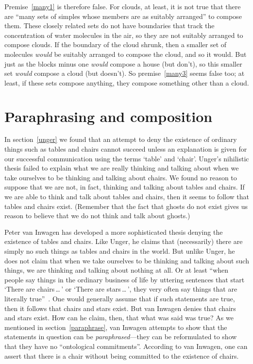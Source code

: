 \documentclass[11pt]{article}
\begin{document}
\begin{spacing}{1.5}
Premise~\ref{many1} is therefore false. For clouds, at least, it is not true that there are ``many sets of simples whose members are as suitably arranged'' to compose them. These closely related sets do not have boundaries that track the concentration of water molecules in the air, so they are not suitably arranged to compose clouds. If the boundary of the cloud shrunk, then a smaller set of molecules {\em would} be suitably arranged to compose the cloud, and so it would. But just as the blocks minus one {\em would} compose a house (but don't), so this smaller set {\em would} compose a cloud (but doesn't). So premise~\ref{many3} seems false too; at least, if these sets compose anything, they compose something other than a cloud.

\section{Paraphrasing and composition}
In section~\ref{unger} we found that an attempt to deny the existence of ordinary things such as tables and chairs cannot succeed unless an explanation is given for our successful communication using the terms `table' and `chair'. Unger's nihilistic thesis failed to explain what we are really thinking and talking about when we take ourselves to be thinking and talking about chairs. We found no reason to suppose that we are not, in fact, thinking and talking about tables and chairs. If we are able to think and talk about tables and chairs, then it seems to follow that tables and chairs exist. (Remember that the fact that ghosts do not exist gives us reason to believe that we do not think and talk about ghosts.)

Peter van Inwagen has developed a more sophisticated thesis denying the existence of tables and chairs. Like Unger, he claims that (necessarily) there are simply no such things as tables and chairs in the world. But unlike Unger, he does not claim that when we take ourselves to be thinking and talking about such things, we are thinking and talking about nothing at all. Or at least ``when people say things in the ordinary business of life by uttering sentences that start `There are chairs\,\ldots\,' or `There are stars\,\ldots\,', they very often say things that are literally true''~\citep[102]{inwagen1995}. One would generally assume that if such statements are true, then it follows that chairs and stars exist. But van Inwagen denies that chairs and stars exist. How can he claim, then, that what was said was true? As we mentioned in section~\ref{paraphrase}, van Inwagen attempts to show that the statements in question can be {\em paraphrased}---they can be reformulated to show that they have no ``ontological commitments''. According to van Inwagen, one can assert that there is a chair without being committed to the existence of chairs.


\end{spacing}
\end{document}
